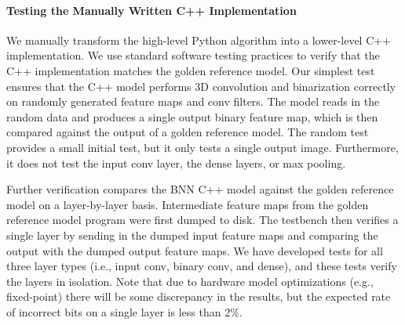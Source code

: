 


\paragraph{Testing the Manually Written C++ Implementation}
We manually transform the high-level Python algorithm into a lower-level
C++ implementation. We use standard software testing practices to verify
that the C++ implementation matches the golden reference model. Our
simplest test ensures that the C++ model performs 3D convolution and
binarization correctly on randomly generated feature maps and conv
filters. The model reads in the random data and produces a single output
binary feature map, which is then compared against the output of a golden
reference model. The random test provides a small initial test, but it
only tests a single output image. Furthermore, it does not test the input
conv layer, the dense layers, or max pooling.

Further verification compares the BNN C++ model against the golden
reference model on a layer-by-layer basis. Intermediate feature maps from
the golden reference model program were first dumped to disk. The
testbench then verifies a single layer by sending in the dumped input
feature maps and comparing the output with the dumped output feature
maps. We have developed tests for all three layer types (i.e., input
conv, binary conv, and dense), and these tests verify the layers in
isolation. Note that due to hardware model optimizations (e.g.,
fixed-point) there will be some discrepancy in the results, but the
expected rate of incorrect bits on a single layer is less than 2\%.

